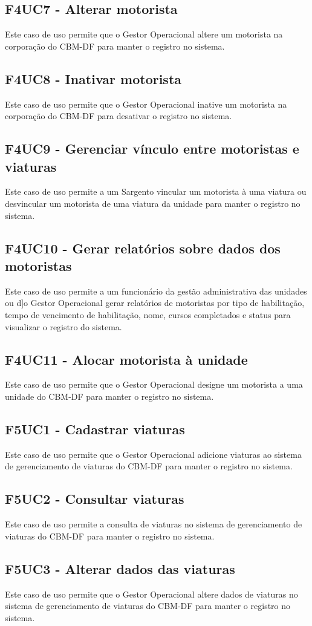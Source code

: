   \subsection{F4UC7 - Alterar motorista}
Este caso de uso permite que o Gestor Operacional altere um motorista na corporação do CBM-DF para manter o registro no sistema.
  \subsection{F4UC8 - Inativar motorista}
Este caso de uso permite que o Gestor Operacional inative um motorista na corporação do CBM-DF para desativar o registro no sistema.
  \subsection{F4UC9 - Gerenciar vínculo entre motoristas e viaturas}
Este caso de uso permite a um Sargento vincular um motorista à uma viatura ou desvincular um motorista de uma viatura da unidade para manter o registro no sistema.
  \subsection{F4UC10 - Gerar relatórios sobre dados dos motoristas}
Este caso de uso permite a um funcionário da gestão administrativa das unidades ou d]o Gestor Operacional gerar relatórios de motoristas por tipo de habilitação, tempo de vencimento de habilitação, nome, cursos completados e status para visualizar o registro do sistema.
  \subsection{F4UC11 - Alocar motorista à unidade}
Este caso de uso permite que o Gestor Operacional designe um motorista a uma unidade do CBM-DF para manter o registro no sistema.
  \subsection{F5UC1 - Cadastrar viaturas}
Este caso de uso permite que o Gestor Operacional adicione viaturas ao sistema de gerenciamento de viaturas do CBM-DF para manter o registro no sistema.
  \subsection{F5UC2 - Consultar viaturas}
Este caso de uso permite a consulta de viaturas no sistema de gerenciamento de viaturas do CBM-DF para manter o registro no sistema.
  \subsection{F5UC3 - Alterar dados das viaturas}
Este caso de uso permite que o Gestor Operacional altere dados de viaturas no sistema de gerenciamento de viaturas do CBM-DF para manter o registro no sistema.
